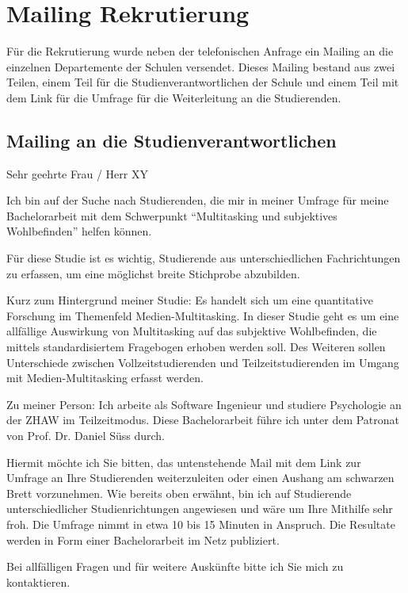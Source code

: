 \section{Mailing Rekrutierung}\label{chap.appendix_mailing}


Für die Rekrutierung wurde neben der telefonischen Anfrage ein Mailing an die einzelnen Departemente der Schulen versendet. Dieses Mailing bestand aus zwei Teilen, einem Teil für die Studienverantwortlichen der Schule und einem Teil mit dem Link für die Umfrage für die Weiterleitung an die Studierenden.

\subsection{Mailing an die Studienverantwortlichen}\label{section.mailingVerantwortliche}
Sehr geehrte Frau / Herr XY

Ich bin auf der Suche nach Studierenden, die mir in meiner Umfrage für meine Bachelorarbeit mit dem Schwerpunkt “Multitasking und subjektives Wohlbefinden” helfen können.

Für diese Studie ist es wichtig, Studierende aus unterschiedlichen Fachrichtungen zu erfassen, um eine möglichst breite Stichprobe abzubilden.

Kurz zum Hintergrund meiner Studie: Es handelt sich um eine quantitative Forschung im Themenfeld Medien-Multitasking. In dieser Studie geht es um eine allfällige Auswirkung von Multitasking auf das subjektive Wohlbefinden, die mittels standardisiertem Fragebogen erhoben werden soll. Des Weiteren sollen Unterschiede zwischen Vollzeitstudierenden und Teilzeitstudierenden im Umgang mit Medien-Multitasking erfasst werden.

Zu meiner Person: Ich arbeite als Software Ingenieur und studiere Psychologie an der ZHAW im Teilzeitmodus. Diese Bachelorarbeit führe ich unter dem Patronat von Prof. Dr. Daniel Süss durch.

Hiermit möchte ich Sie bitten, das untenstehende Mail mit dem Link zur Umfrage an Ihre Studierenden weiterzuleiten oder einen Aushang am schwarzen Brett vorzunehmen. Wie bereits oben erwähnt, bin ich auf Studierende unterschiedlicher Studienrichtungen angewiesen und wäre um Ihre Mithilfe sehr froh. Die Umfrage nimmt in etwa 10 bis 15 Minuten in Anspruch. Die Resultate werden in Form einer Bachelorarbeit im Netz publiziert.

Bei allfälligen Fragen und für weitere Auskünfte bitte ich Sie mich zu kontaktieren.

